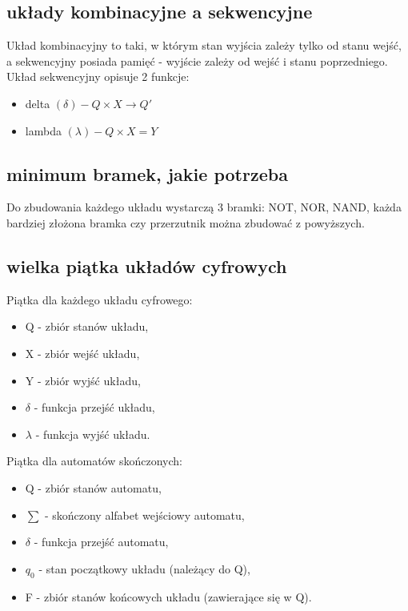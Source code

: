 \newpage

\subsection{układy kombinacyjne a sekwencyjne}

Układ kombinacyjny to taki, w którym stan wyjścia zależy tylko od stanu wejść, a sekwencyjny posiada pamięć - wyjście zależy od wejść i stanu poprzedniego.\\
Układ sekwencyjny opisuje 2 funkcje:
\begin{itemize}
    \item delta $(\delta) - Q\times X \rightarrow Q'$
    \item lambda $(\lambda) - Q\times X = Y$ 
\end{itemize}

\subsection{minimum bramek, jakie potrzeba}

Do zbudowania każdego układu wystarczą 3 bramki: NOT, NOR, NAND, każda bardziej złożona bramka czy przerzutnik można zbudować z powyższych.

\subsection{wielka piątka układów cyfrowych}
Piątka dla każdego układu cyfrowego:
\begin{itemize}
    \item Q - zbiór stanów układu,
    \item X - zbiór wejść układu,
    \item Y - zbiór wyjść układu,
    \item $\delta$ - funkcja przejść układu,
    \item $\lambda$ - funkcja wyjść układu.
\end{itemize}
Piątka dla automatów skończonych:
\begin{itemize}
    \item Q - zbiór stanów automatu,
    \item $\sum$ - skończony alfabet wejściowy automatu,
    \item $\delta$ - funkcja przejść automatu,
    \item $q_0$ - stan początkowy układu (należący do Q),
    \item F - zbiór stanów końcowych układu (zawierające się w Q).
\end{itemize}

